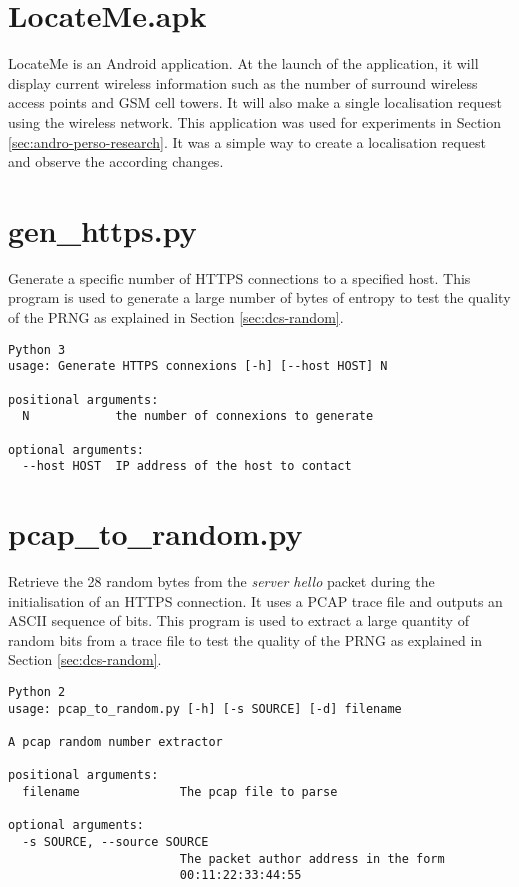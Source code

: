 \section{LocateMe.apk}

LocateMe is an Android application.
At the launch of the application, it will display current wireless information such as the number of surround wireless access points and GSM cell towers.
It will also make a single localisation request using the wireless network.
This application was used for experiments in Section \ref{sec:andro-perso-research}.
It was a simple way to create a localisation request and observe the according changes.


\section{gen\_https.py}

Generate a specific number of HTTPS connections to a specified host.
This program is used to generate a large number of bytes of entropy to test the quality of the PRNG as explained in Section \ref{sec:dcs-random}.

\begin{verbatim}
Python 3 
usage: Generate HTTPS connexions [-h] [--host HOST] N

positional arguments:
  N            the number of connexions to generate

optional arguments:
  --host HOST  IP address of the host to contact
\end{verbatim}

\section{pcap\_to\_random.py}

Retrieve the 28 random bytes from the \emph{server hello} packet during the initialisation of an HTTPS connection.
It uses a PCAP trace file and outputs an ASCII sequence of bits.
This program is used to extract a large quantity of random bits from a trace file to test the quality of the PRNG as explained in Section \ref{sec:dcs-random}.

\begin{verbatim}
Python 2
usage: pcap_to_random.py [-h] [-s SOURCE] [-d] filename

A pcap random number extractor

positional arguments:
  filename              The pcap file to parse

optional arguments:
  -s SOURCE, --source SOURCE
                        The packet author address in the form
                        00:11:22:33:44:55
\end{verbatim}

